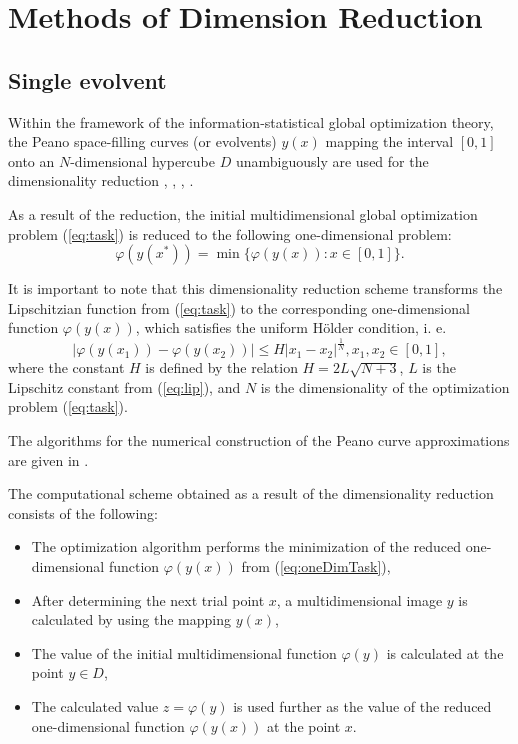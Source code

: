 \documentclass[3p,times,procedia]{elsarticle}
\begin{document}
\section{Methods of Dimension Reduction}
\subsection{Single evolvent}

Within the framework of the information-statistical global optimization theory,
the Peano space-filling curves (or evolvents) \(y(x)\) mapping the interval \([0,1]\)
onto an \(N\)-dimensional hypercube \(D\) unambiguously are used for the dimensionality
reduction \cite{sergeyevStronginLera2013}, \cite{strongin1978},
\cite{stronginGergelBarkalovParGO}, \cite{strSergGO}.
\par
As a result of the reduction, the initial multidimensional global optimization
problem (\ref{eq:task}) is reduced to the following one-dimensional problem:
\begin{equation}
\label{eq:oneDimTask}
\varphi(y(x^*))=\min\{\varphi(y(x)):x\in [0,1]\}.
\end{equation}
\par
It is important to note that this dimensionality reduction scheme transforms the %
Lipschitzian function from (\ref{eq:task}) to the corresponding one-dimensional
function \(\varphi(y(x))\), which satisfies the uniform H{\"o}lder condition, i. e.
\begin{equation}
\label{eq:holder}
|\varphi(y(x_1))-\varphi(y(x_2))|\leq H{|x_1-x_2|}^{\frac{1}{N}}, x_1,x_2\in[0,1],
\end{equation}
where the constant $H$ is defined by the relation \(H=2L\sqrt{N+3}\), \(L\) is the Lipschitz
constant from (\ref{eq:lip}), and \(N\) is the dimensionality of the optimization problem
(\ref{eq:task}).
\par
The algorithms for the numerical construction of the Peano curve approximations are
given in \cite{strSergGO}.

\par
The computational scheme obtained as a result of the dimensionality reduction consists of the
following:
\begin{itemize}
  \item The optimization algorithm performs the minimization of the reduced one-dimensional
  function \(\varphi(y(x))\) from (\ref{eq:oneDimTask}),
  \item After determining the next trial point \(x\), a multidimensional image \(y\) is calculated by
using the mapping \(y(x)\),
  \item The value of the initial multidimensional function \(\varphi(y)\) is calculated at the point
\(y\in D\),
  \item The calculated value \(z=\varphi(y)\) is used further as the value of the reduced one-dimensional function \(\varphi(y(x))\) at the point \(x\).
\end{itemize}
\end{document}
